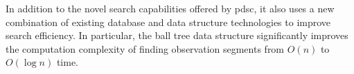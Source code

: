 \documentclass[twocolumn]{extarticle}
\begin{document}
In addition to the novel search capabilities offered by \ac{pdsc}, it also uses
a new combination of existing database and data structure technologies to
improve search efficiency. In particular, the ball tree data structure
significantly improves the computation complexity of finding observation
segments from $O(n)$ to $O(\log n)$ time.



\end{document}
